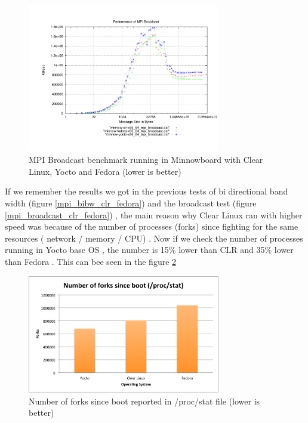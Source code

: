 \begin{figure}[H]
\centering
\includegraphics[width=0.75\textwidth]{images/mpbench_yocto_experiments/mpi_broadcast.pdf}
\caption{MPI Broadcast benchmark running in Minnowboard with Clear Linux, Yocto
and Fedora (lower is better)}
\label{mpi_broadcast_yocto}
\end{figure}

If we remember the results we got in the previous tests of bi directional band
width (figure \ref{mpi_bibw_clr_fedora}) and the broadcast test (figure
\ref{mpi_broadcast_clr_fedora}) , the main reason why Clear Linux ran with
higher speed was because of the number of processes (forks) since fighting for
the same resources ( network / memory / CPU) . Now if we check the number of
processes running in Yocto base OS , the number is 15\% lower than CLR and 35\%
lower than Fedora . This can bee seen in the figure \ref{number_forks_yocto}

\begin{figure}[H]
\centering
\includegraphics[width=0.75\textwidth]{images/number_forks_yocto.png}
\caption{Number of forks since boot reported in /proc/stat file (lower is better)}
\label{number_forks_yocto}
\end{figure}

